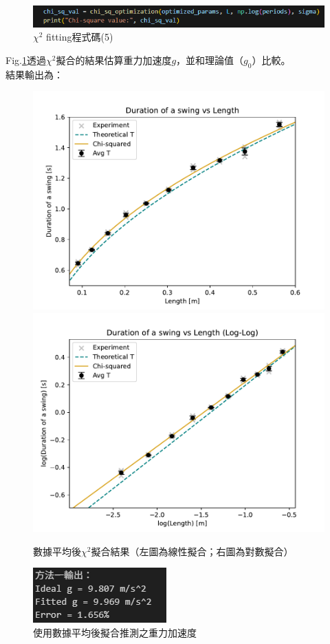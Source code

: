 \documentclass[12pt,a4paper]{article}
\begin{document}
\begin{CJK}{UTF8}{bkai}
\begin{figure}[h]
    \centering
    \includegraphics[width=1\linewidth]{chi5.png}
    \caption{$\chi ^2$ fitting程式碼(5)}
    \label{fig:chi5}
\end{figure}
Fig.\ref{fig:chi5}透過$\chi^2$擬合的結果估算重力加速度$g$，並和理論值（$g_0$）比較。\\



結果輸出為：
\begin{figure}[h]
    \centering
    \includegraphics[width=0.49\linewidth]{chisq.pdf}
    \includegraphics[width=0.49\linewidth]{chisq_log.pdf}
    \caption{數據平均後$\chi^2$擬合結果（左圖為線性擬合；右圖為對數擬合）}
    \label{fig:chi_sq}
\end{figure}

\clearpage

\begin{figure}[h]
    \centering
    \includegraphics[width=0.5\linewidth]{Q1-1.png}
    \caption{使用數據平均後擬合推測之重力加速度}
    \label{fig:Q1-1}
\end{figure}



\end{CJK}
\end{document}
